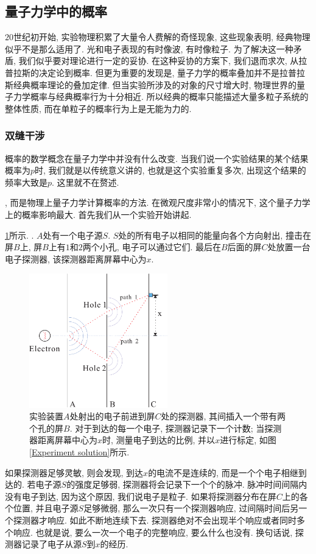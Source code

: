 \documentclass[a4paper,11pt]{article}
\theoremstyle{mystyle}
\begin{document}
\subsection{量子力学中的概率}
$20$世纪初开始, 实验物理积累了大量令人费解的奇怪现象, 这些现象表明, 经典物理似乎不是那么适用了. 光和电子表现的有时像波, 有时像粒子. 为了解决这一种矛盾, 我们似乎要对理论进行一定的妥协. 在这种妥协的方案下, 我们退而求次, 从拉普拉斯的决定论到概率. 但更为重要的发现是, 量子力学的概率叠加并不是拉普拉斯经典概率理论的叠加定律. 但当实验所涉及的对象的尺寸增大时, 物理世界的量子力学概率与经典概率行为十分相近. 所以经典的概率只能描述大量多粒子系统的整体性质, 而在单粒子的概率行为上是无能为力的.
\subsubsection{双缝干涉}
概率的数学概念在量子力学中并没有什么改变. 当我们说一个实验结果的某个结果概率为$p$时, 我们就是以传统意义讲的,  也就是这个实验重复多次, 出现这个结果的频率大致是$p$. 这里就不在赘述.

, 而是物理上量子力学计算概率的方法. 在微观尺度非常小的情况下, 这个量子力学上的概率影响最大. 首先我们从一个实验开始讲起.

\ref{pic-electron}所示. . $A$处有一个电子源$S$. $S$处的所有电子以相同的能量向各个方向射出,  撞击在屏$B$上, 屏$B$上有$1$和$2$两个小孔, 电子可以通过它们. 最后在$B$后面的屏$C$处放置一台电子探测器, 该探测器距离屏幕中心为$x$.
\begin{figure}[H]
  \centering
  \includegraphics[width=6cm]{fig4.pdf}
  \caption{实验装置$A$处射出的电子前进到屏$C$处的探测器, 其间插入一个带有两个孔的屏$B$. 对于到达的每一个电子, 探测器记录下一个计数; 当探测器距离屏幕中心为$x$时, 测量电子到达的比例, 并以$x$进行标定, 如图\ref{Experiment solution}所示.}\label{pic-electron}
\end{figure}
如果探测器足够灵敏, 则会发现, 到达$x$的电流不是连续的, 而是一个个电子相继到达的. 若电子源$S$的强度足够弱, 探测器将会记录下一个个的脉冲. 脉冲时间间隔内没有电子到达, 因为这个原因, 我们说电子是粒子. 如果将探测器分布在屏$C$上的各个位置, 并且电子源$S$足够微弱, 那么一次只有一个探测器响应, 过间隔时间后另一个探测器才响应. 如此不断地连续下去. 探测器绝对不会出现半个响应或者同时多个响应. 也就是说, 要么一次一个电子的完整响应, 要么什么也没有. 换句话说, 探测器记录了电子从源$S$到$x$的经历.
\end{document}
